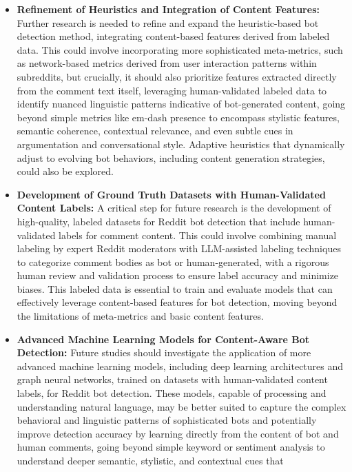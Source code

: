 \documentclass[
  12pt,
  letterpaper,
  DIV=11,
  numbers=noendperiod]{scrartcl}
\begin{document}
\begin{itemize}
\item
  \textbf{Refinement of Heuristics and Integration of Content Features:}
  Further research is needed to refine and expand the heuristic-based
  bot detection method, integrating content-based features derived from
  labeled data. This could involve incorporating more sophisticated
  meta-metrics, such as network-based metrics derived from user
  interaction patterns within subreddits, but crucially, it should also
  prioritize features extracted directly from the comment text itself,
  leveraging human-validated labeled data to identify nuanced linguistic
  patterns indicative of bot-generated content, going beyond simple
  metrics like em-dash presence to encompass stylistic features,
  semantic coherence, contextual relevance, and even subtle cues in
  argumentation and conversational style. Adaptive heuristics that
  dynamically adjust to evolving bot behaviors, including content
  generation strategies, could also be explored.
\item
  \textbf{Development of Ground Truth Datasets with Human-Validated
  Content Labels:} A critical step for future research is the
  development of high-quality, labeled datasets for Reddit bot detection
  that include human-validated labels for comment content. This could
  involve combining manual labeling by expert Reddit moderators with
  LLM-assisted labeling techniques to categorize comment bodies as bot
  or human-generated, with a rigorous human review and validation
  process to ensure label accuracy and minimize biases. This labeled
  data is essential to train and evaluate models that can effectively
  leverage content-based features for bot detection, moving beyond the
  limitations of meta-metrics and basic content features.
\item
  \textbf{Advanced Machine Learning Models for Content-Aware Bot
  Detection:} Future studies should investigate the application of more
  advanced machine learning models, including deep learning
  architectures and graph neural networks, trained on datasets with
  human-validated content labels, for Reddit bot detection. These
  models, capable of processing and understanding natural language, may
  be better suited to capture the complex behavioral and linguistic
  patterns of sophisticated bots and potentially improve detection
  accuracy by learning directly from the content of bot and human
  comments, going beyond simple keyword or sentiment analysis to
  understand deeper semantic, stylistic, and contextual cues that

\end{itemize}
\end{document}
